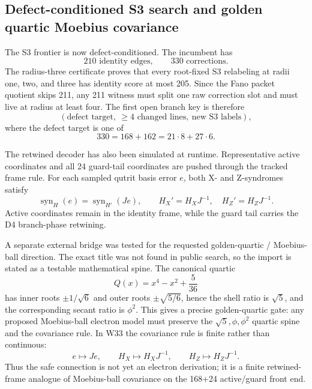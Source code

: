 \subsection{Defect-conditioned S3 search and golden quartic Moebius covariance}
\label{sec:bt1431-bt1434-defect-golden-mobius}

The S3 frontier is now defect-conditioned.  The incumbent has
\[
210\text{ identity edges},\qquad 330\text{ corrections}.
\]
The radius-three certificate proves that every root-fixed S3 relabeling at
radii one, two, and three has identity score at most 205.  Since the Fano packet
quotient skips 211, any 211 witness must split one raw correction slot and must
live at radius at least four.  The first open branch key is therefore
\[
(\text{defect target},\ \ge4\text{ changed lines},\ \text{new S3 labels}),
\]
where the defect target is one of
\[
330=168+162=21\cdot8+27\cdot6.
\]

The retwined decoder has also been simulated at runtime.  Representative active
coordinates and all 24 guard-tail coordinates are pushed through the tracked
frame rule.  For each sampled qutrit basis error \(e\), both X- and Z-syndromes
satisfy
\[
\operatorname{syn}_{H}(e)=\operatorname{syn}_{H'}(Je),
\qquad
H_X'=H_XJ^{-1},\quad H_Z'=H_ZJ^{-1}.
\]
Active coordinates remain in the identity frame, while the guard tail carries
the D4 branch-phase retwining.

A separate external bridge was tested for the requested golden-quartic /
Moebius-ball direction.  The exact title was not found in public search, so the
import is stated as a testable mathematical spine.  The canonical quartic
\[
Q(x)=x^4-x^2+\frac{5}{36}
\]
has inner roots \(\pm1/\sqrt6\) and outer roots \(\pm\sqrt{5/6}\), hence the
shell ratio is \(\sqrt5\), and the corresponding secant ratio is \(\phi^2\).
This gives a precise golden-quartic gate: any proposed Moebius-ball electron
model must preserve the \(\sqrt5,\phi,\phi^2\) quartic spine and the covariance
rule.  In W33 the covariance rule is finite rather than continuous:
\[
e\mapsto Je,\qquad H_X\mapsto H_XJ^{-1},\qquad H_Z\mapsto H_ZJ^{-1}.
\]
Thus the safe connection is not yet an electron derivation; it is a finite
retwined-frame analogue of Moebius-ball covariance on the 168+24 active/guard
front end.
